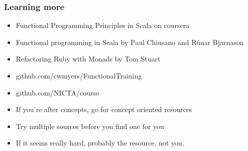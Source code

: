 \documentclass{beamer}
\begin{document}
\begin{frame}
  \frametitle{Learning more}
  \begin{itemize}
    \item Functional Programming Principles in Scala on coursera
    \item Functional programming in Scala by Paul Chiusano and Rúnar Bjarnason
    \item Refactoring Ruby with Monads by Tom Stuart
    \item github.com/cwmyers/FunctionalTraining
    \item github.com/NICTA/course
    \item If you're after concepts, go for concept oriented resources
    \item Try multiple sources before you find one for you
    \item If it seems really hard, probably the resource, not you.
  \end{itemize}
\end{frame}
\end{document}

